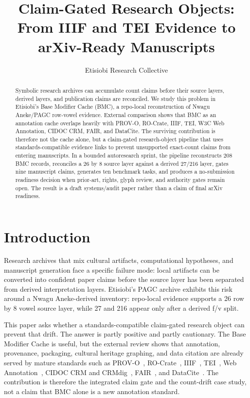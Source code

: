 \documentclass[manuscript]{acmart}
\title{Claim-Gated Research Objects: From IIIF and TEI Evidence to arXiv-Ready Manuscripts}
\author{Etisiobi Research Collective}
\affiliation{\institution{The Beaconsmith Collective}\city{Enugu}\country{Nigeria}}
\begin{document}
\begin{abstract}
Symbolic research archives can accumulate count claims before their source layers, derived layers, and publication claims are reconciled. We study this problem in Etisiobi's Base Modifier Cache (BMC), a repo-local reconstruction of Nwagu Aneke/PAGC row-vowel evidence. External comparison shows that BMC as an annotation cache overlaps heavily with PROV-O, RO-Crate, IIIF, TEI, W3C Web Annotation, CIDOC CRM, FAIR, and DataCite. The surviving contribution is therefore not the cache alone, but a claim-gated research-object pipeline that uses standards-compatible evidence links to prevent unsupported exact-count claims from entering manuscripts. In a bounded autoresearch sprint, the pipeline reconstructs 208 BMC records, reconciles a 26 by 8 source layer against a derived 27/216 layer, gates nine manuscript claims, generates ten benchmark tasks, and produces a no-submission readiness decision when prior-art, rights, glyph review, and authority gates remain open. The result is a draft systems/audit paper rather than a claim of final arXiv readiness.
\end{abstract}


\maketitle



\section{Introduction}
Research archives that mix cultural artifacts, computational hypotheses, and manuscript generation face a specific failure mode: local artifacts can be converted into confident paper claims before the source layer has been separated from derived interpretation layers. Etisiobi's PAGC archive exhibits this risk around a Nwagu Aneke-derived inventory: repo-local evidence supports a 26 row by 8 vowel source layer, while 27 and 216 appear only after a derived f/v split.

This paper asks whether a standards-compatible claim-gated research object can prevent that drift. The answer is partly positive and partly cautionary. The Base Modifier Cache is useful, but the external review shows that annotation, provenance, packaging, cultural heritage graphing, and data citation are already served by mature standards such as PROV-O~\cite{w3c_provo_2013}, RO-Crate~\cite{rocrate_spec_2023,soilandreyes_rocrate_2022}, IIIF~\cite{iiif_presentation_3}, TEI~\cite{tei_guidelines,tei_glyphs}, Web Annotation~\cite{w3c_annotation_2017,w3c_annotation_vocab_2017}, CIDOC CRM and CRMdig~\cite{cidoc_crm_home,cidoc_crm_713,crmdig_50}, FAIR~\cite{gofair_principles,wilkinson_fair_2016}, and DataCite~\cite{datacite_46}. The contribution is therefore the integrated claim gate and the count-drift case study, not a claim that BMC alone is a new annotation standard.
\end{document}
